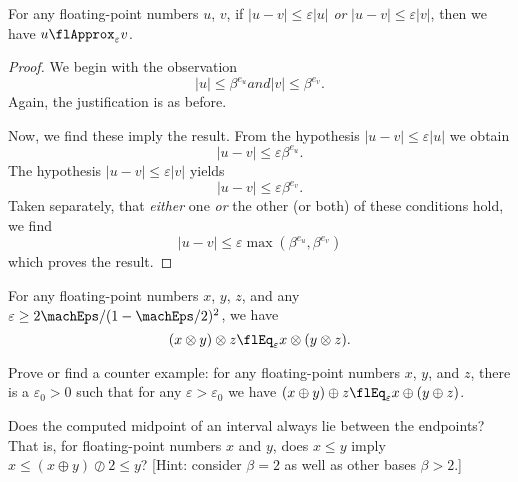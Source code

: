 \begin{thm}
  For any floating-point numbers $u$, $v$, if $|u-v|\leq\varepsilon|u|$
  \emph{or} $|u-v|\leq\varepsilon|v|$, then we have $u\flApprox_{\varepsilon}v$.
\end{thm}
\begin{proof}
  We begin with the observation
  \begin{subequations}
    \begin{equation}
      |u|\leq \beta^{e_{u}}
    \end{equation}
    and
    \begin{equation}
      |v|\leq\beta^{e_{v}}.
    \end{equation}
  \end{subequations}
  Again, the justification is as before.

  Now, we find these imply the result. From the hypothesis $|u-v|\leq\varepsilon|u|$
  we obtain
  \begin{equation}
    |u-v|\leq\varepsilon\beta^{e_{u}}.
  \end{equation}
  The hypothesis $|u-v|\leq\varepsilon|v|$ yields
  \begin{equation}
    |u-v|\leq\varepsilon\beta^{e_{v}}.
  \end{equation}
  Taken separately, that \emph{either} one \emph{or} the other (or both)
  of these conditions hold, we find
  \begin{equation}
    |u-v|\leq\varepsilon\max(\beta^{e_{u}},\beta^{e_{v}})
  \end{equation}
  which proves the result.
\end{proof}



\begin{thm}
  For any floating-point numbers $x$, $y$, $z$, and any
  $\varepsilon\geq 2\machEps/(1 - \machEps/2)^{2}$, we have
  \begin{equation}
    (x\otimes y)\otimes z\flEq_{\varepsilon}x\otimes(y\otimes z).
  \end{equation}
\end{thm}

\begin{xca}
  Prove or find a counter example: for any floating-point numbers $x$,
  $y$, and $z$, there is a $\varepsilon_{0}>0$ such that for any
  $\varepsilon>\varepsilon_{0}$ we have $(x\oplus y)\oplus z\flEq_{\varepsilon}x\oplus(y\oplus z)$.
\end{xca}

\begin{xca}
  Does the computed midpoint of an interval always lie between the
  endpoints? That is, for floating-point numbers $x$ and $y$, does
  $x\leq y$ imply $x\leq (x\oplus y)\oslash 2\leq y$? [Hint: consider
    $\beta=2$ as well as other bases $\beta>2$.]
\end{xca}

